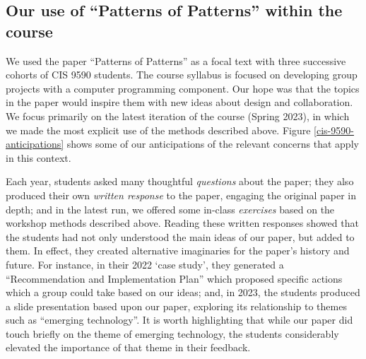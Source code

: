 \documentclass[acmlarge,timestamp]{acmart}
\begin{document}
\subsection{Our use of “Patterns of Patterns” within the course}
\label{pop1-in-cis9590}
We used the paper “Patterns of Patterns” as a focal text with three
successive cohorts of CIS 9590 students.  The course syllabus is
focused on developing group projects with a computer programming
component.  Our hope was that the topics in the paper would inspire
them with new ideas about design and collaboration.  We focus
primarily on the latest iteration of the course (Spring 2023), in
which we made the most explicit use of the methods described above.
Figure \ref{cis-9590-anticipations} shows some of our anticipations of
the relevant concerns that apply in this context.

Each year, students asked many thoughtful \emph{questions} about the
paper; they also produced their own \emph{written response} to the
paper, engaging the original paper in depth; and in the latest run, we
offered some in-class \emph{exercises} based on the workshop methods
described above.  Reading these written responses showed that the
students had not only understood the main ideas of our paper, but
added to them.  In effect, they created alternative imaginaries for
the paper’s history and future.  For instance, in their 2022 ‘case
study’, they generated a “Recommendation and Implementation Plan”
which proposed specific actions which a group could take based on our
ideas; and, in 2023, the students produced a slide presentation based
upon our paper, exploring its relationship to themes such as “emerging
technology”.  It is worth highlighting that while our paper did touch
briefly on the theme of emerging technology, the students considerably
elevated the importance of that theme in their feedback.
\end{document}
